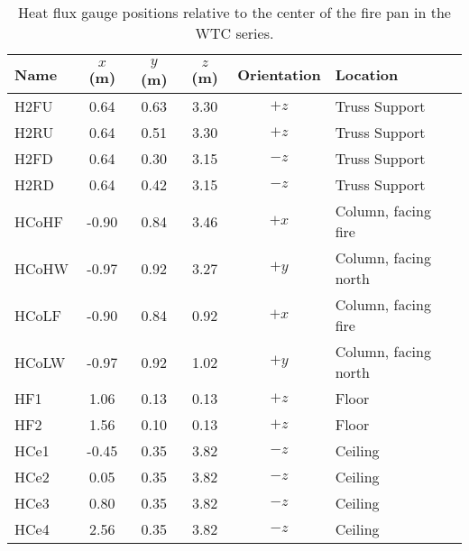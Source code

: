 \begin{table}[!h]
\caption[Heat flux gauge positions relative to the center of the fire pan in the WTC series]
{Heat flux gauge positions relative to the center of the fire pan in the WTC series.}
\begin{center}
\begin{tabular}{|l|c|c|c|c|l|}
\hline
Name    & $x$ (m)   & $y$ (m) & $z$ (m)   & Orientation  & Location              \\ \hline \hline
H2FU    & 0.64      & 0.63    & 3.30      &     $+z$     & Truss Support         \\ \hline
H2RU    & 0.64      & 0.51    & 3.30      &     $+z$     & Truss Support         \\ \hline
H2FD    & 0.64      & 0.30    & 3.15      &     $-z$     & Truss Support         \\ \hline
H2RD    & 0.64      & 0.42    & 3.15      &     $-z$     & Truss Support         \\ \hline
HCoHF   & -0.90     & 0.84    & 3.46      &     $+x$     & Column, facing fire   \\ \hline
HCoHW   & -0.97     & 0.92    & 3.27      &     $+y$     & Column, facing north  \\ \hline
HCoLF   & -0.90     & 0.84    & 0.92      &     $+x$     & Column, facing fire   \\ \hline
HCoLW   & -0.97     & 0.92    & 1.02      &     $+y$     & Column, facing north  \\ \hline
HF1     & 1.06      & 0.13    & 0.13      &     $+z$     & Floor                 \\ \hline
HF2     & 1.56      & 0.10    & 0.13      &     $+z$     & Floor                 \\ \hline
HCe1    & -0.45     & 0.35    & 3.82      &     $-z$     & Ceiling               \\ \hline
HCe2    &  0.05     & 0.35    & 3.82      &     $-z$     & Ceiling               \\ \hline
HCe3    &  0.80     & 0.35    & 3.82      &     $-z$     & Ceiling               \\ \hline
HCe4    &  2.56     & 0.35    & 3.82      &     $-z$     & Ceiling               \\ \hline
\end{tabular}
\end{center}
\label{WTC_Gauges}
\end{table}

\newpage

